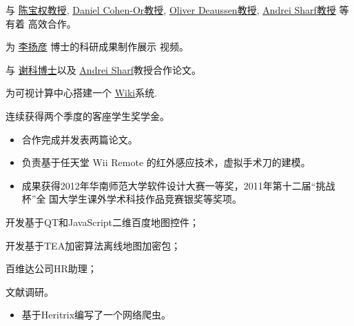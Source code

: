 \documentclass[11pt,a4paper,nolmodern]{moderncv}
\begin{document}

{
\begin{tightitemize}%
 \item 与 \href{http://web.siat.ac.cn/~baoquan/}{陈宝权教授},
   \href{http://www.math.tau.ac.il/~dcor/}{Daniel Cohen-Or教授},
   \href{http://graphics.uni-konstanz.de/mitarbeiter/deussen.php}{Oliver
     Deaussen教授}, \href{http://www.idav.ucdavis.edu/~asharf/}{Andrei Sharf教授} 等有着
   高效合作。
 \item 为 \href{http://web.siat.ac.cn/~yangyan/}{李扬彦} 博士的科研成果制作展示
   视频。
 \item 与 \href{http://web.siat.ac.cn/~kexie}{谢科博士}以及
   \href{http://www.idav.ucdavis.edu/~asharf/}{Andrei Sharf}教授合作论文。
 \item 为可视计算中心搭建一个
   \href{http://vcc.siat.ac.cn/w/index.php/Main_Page}{Wiki}系统.   
 \item 连续获得两个季度的客座学生奖学金。
 \end{tightitemize}}

%
  {
\begin{itemize}
 \item 合作完成并发表两篇论文。
 \item 负责基于任天堂 Wii Remote 的红外感应技术，虚拟手术刀的建模。
 \item 成果获得2012年华南师范大学软件设计大赛一等奖，2011年第十二届“挑战杯”全
   国大学生课外学术科技作品竞赛银奖等奖项。
\end{itemize}}

{
\begin{tightitemize}%
 \item 开发基于QT和JavaScript二维百度地图控件；
 \item 开发基于TEA加密算法离线地图加密包；
 \item 百维达公司HR助理；
 \item 文献调研。
 \end{tightitemize}}

%
  {
\begin{itemize}
 \item 基于Heritrix编写了一个网络爬虫。
\end{itemize}}
\end{document}
